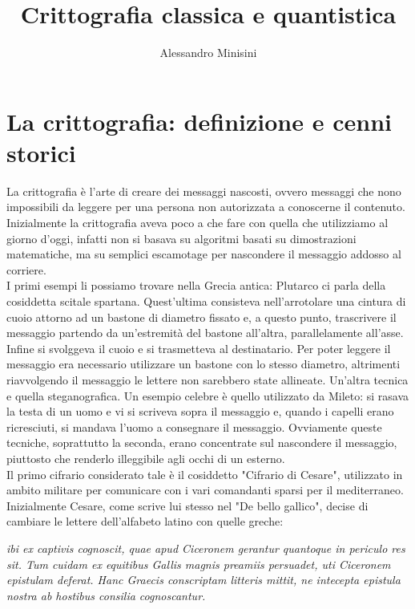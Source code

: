 \documentclass[italian,A4,12pt]{article}
\title{Crittografia classica e quantistica}
\author{Alessandro Minisini}
\affil{Liceo Scientifico Niccolò Copernico}
\date{}
\begin{document}
  \maketitle
  \section{La crittografia: definizione e cenni storici}
    La crittografia è l'arte di creare dei messaggi nascosti, ovvero messaggi che nono impossibili da leggere per una persona non autorizzata a conoscerne il contenuto.\\
    Inizialmente la crittografia aveva poco a che fare con quella che utilizziamo al giorno d'oggi, infatti non si basava su algoritmi basati su dimostrazioni matematiche, ma su semplici escamotage per nascondere il messaggio addosso al corriere.\\
    I primi esempi li possiamo trovare nella Grecia antica: Plutarco ci parla della cosiddetta scitale spartana. Quest'ultima consisteva nell'arrotolare una cintura di cuoio attorno ad un bastone di diametro fissato e, a questo punto, trascrivere il messaggio partendo da un'estremità del bastone all'altra, parallelamente all'asse. Infine si svolggeva il cuoio e si trasmetteva al destinatario. Per poter leggere il messaggio era necessario utilizzare un bastone con lo stesso diametro, altrimenti riavvolgendo il messaggio le lettere non sarebbero state allineate. Un'altra tecnica e quella steganografica. Un esempio celebre è quello utilizzato da Mileto: si rasava la testa di un uomo e vi si scriveva sopra il messaggio e, quando i capelli erano ricresciuti, si mandava l'uomo a consegnare il messaggio.
    Ovviamente queste tecniche, soprattutto la seconda, erano concentrate sul nascondere il messaggio, piuttosto che renderlo illeggibile agli occhi di un esterno.\\
    Il primo cifrario considerato tale è il cosiddetto "Cifrario di Cesare", utilizzato in ambito militare per comunicare con i vari comandanti sparsi per il mediterraneo.
    Inizialmente Cesare, come scrive lui stesso nel "De bello gallico", decise di cambiare le lettere dell'alfabeto latino con quelle greche:
    \newpage
    \begin{displayquote}
      \textit{ibi ex captivis cognoscit, quae apud Ciceronem gerantur quantoque in periculo res sit.
      Tum cuidam ex equitibus Gallis magnis preamiis persuadet, uti Ciceronem epistulam deferat.
      Hanc Graecis conscriptam litteris mittit, ne intecepta epistula nostra ab hostibus consilia cognoscantur.}
    \end{displayquote}
\end{document}
